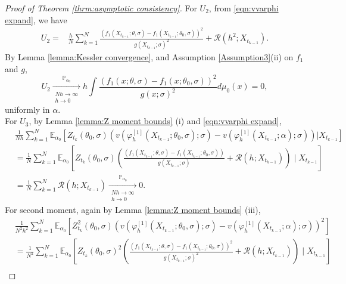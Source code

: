\documentclass[a4paper,12pt]{article}
\numberwithin{equation}{section}
\theoremstyle{plain}
\theoremstyle{definition}
\begin{document}
\begin{appendix}
\begin{proof}[Proof of Theorem \ref{thrm:asymptotic consistency}]
    For $U_2$, from \eqref{eqn:vvarphi expand}, we have
    \begin{align*}
        U_2
        =&\frac{h}{N}\sum_{k=1}^N\frac{\left(f_1(X_{t_{k-1}};\theta,\sigma)-f_1(X_{t_{k-1}};\theta_0,\sigma)\right)^2}{g(X_{t_{k-1}};\sigma)^2}+\mathcal{R}(h^2;X_{t_{k-1}}).
    \end{align*}
    By Lemma \ref{lemma:Kessler convergence}, and Assumption \ref{Assumption3}(ii) on $f_1$ and $g$,
    \begin{equation}\label{eqn:U_2 limit}
        U_2\xrightarrow[\substack{N h\rightarrow\infty \\ h \rightarrow 0}]{\mathbb{P}_{\alpha_0}}h\int\frac{\left(f_1(x;\theta,\sigma)-f_1(x;\theta_0,\sigma)\right)^2}{g(x;\sigma)^2}d\mu_0(x)=0,
    \end{equation}
    uniformly in $\alpha$.\\
     For $U_3$, by Lemma \ref{lemma:Z moment bounds} (i) and \eqref{eqn:vvarphi expand},
    \begin{align*}
        &\frac{1}{Nh}\sum_{k=1}^N\mathbb{E}_{\alpha_0}\left[Z_{t_k}(\theta_0,\sigma)\left(v\left(\varphi^{[1]}_h(X_{t_{k-1}};\theta_0,\sigma) ; \sigma\right)-v\left(\varphi^{[1]}_h(X_{t_{k-1}};\alpha) ; \sigma \right)\right)|X_{t_{k-1}}\right]\\
        &=\frac{1}{N}\sum_{k=1}^N\mathbb{E}_{\alpha_0}\left[Z_{t_k}(\theta_0,\sigma)\left(\frac{\left(f_1(X_{t_{k-1}};\theta,\sigma)-f_1(X_{t_{k-1}};\theta_0,\sigma)\right)}{g(X_{t_{k-1}};\sigma)}+\mathcal{R}(h;X_{t_{k-1}})\right)\mid X_{t_{k-1}}\right]\\
        &=\frac{1}{N}\sum_{k=1}^N\mathcal{R}(h;X_{t_{k-1}})\xrightarrow[\substack{N h\rightarrow\infty \\ h \rightarrow 0}]{\mathbb{P}_{\alpha_0}}0.
    \end{align*}
    For second moment, again by Lemma \ref{lemma:Z moment bounds} (iii),
    \begin{align*}
         &\frac{1}{N^2h^2}\sum_{k=1}^N\mathbb{E}_{\alpha_0}\left[Z^2_{t_k}(\theta_0,\sigma)\left(v\left(\varphi^{[1]}_h(X_{t_{k-1}};\theta_0,\sigma) ; \sigma\right)-v\left(\varphi^{[1]}_h(X_{t_{k-1}};\alpha) ; \sigma \right)\right)^2\right]\\
         &=\frac{1}{N^2}\sum_{k=1}^N\mathbb{E}_{\alpha_0}\left[Z_{t_k}(\theta_0,\sigma)^2\left(\frac{\left(f_1(X_{t_{k-1}};\theta,\sigma)-f_1(X_{t_{k-1}};\theta_0,\sigma)\right)^2}{g(X_{t_{k-1}};\sigma)^2}+\mathcal{R}(h;X_{t_{k-1}})\right)\mid X_{t_{k-1}}\right]\\

\end{align*}
\end{proof}
\end{appendix}
\end{document}
